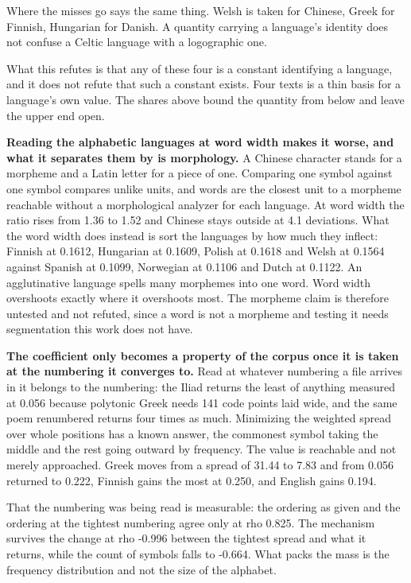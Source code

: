 Where the misses go says the same thing. Welsh is taken for Chinese, Greek for Finnish, Hungarian for Danish. A quantity carrying a language's identity does not confuse a Celtic language with a logographic one.

What this refutes is that any of these four is a constant identifying a language, and it does not refute that such a constant exists. Four texts is a thin basis for a language's own value. The shares above bound the quantity from below and leave the upper end open.

\textbf{Reading the alphabetic languages at word width makes it worse, and what it separates them by is morphology.} A Chinese character stands for a morpheme and a Latin letter for a piece of one. Comparing one symbol against one symbol compares unlike units, and words are the closest unit to a morpheme reachable without a morphological analyzer for each language. At word width the ratio rises from 1.36 to 1.52 and Chinese stays outside at 4.1 deviations. What the word width does instead is sort the languages by how much they inflect: Finnish at 0.1612, Hungarian at 0.1609, Polish at 0.1618 and Welsh at 0.1564 against Spanish at 0.1099, Norwegian at 0.1106 and Dutch at 0.1122. An agglutinative language spells many morphemes into one word. Word width overshoots exactly where it overshoots most. The morpheme claim is therefore untested and not refuted, since a word is not a morpheme and testing it needs segmentation this work does not have.

\textbf{The coefficient only becomes a property of the corpus once it is taken at the numbering it converges to.} Read at whatever numbering a file arrives in it belongs to the numbering: the Iliad returns the least of anything measured at 0.056 because polytonic Greek needs 141 code points laid wide, and the same poem renumbered returns four times as much. Minimizing the weighted spread over whole positions has a known answer, the commonest symbol taking the middle and the rest going outward by frequency. The value is reachable and not merely approached. Greek moves from a spread of 31.44 to 7.83 and from 0.056 returned to 0.222, Finnish gains the most at 0.250, and English gains 0.194.

That the numbering was being read is measurable: the ordering as given and the ordering at the tightest numbering agree only at rho 0.825. The mechanism survives the change at rho -0.996 between the tightest spread and what it returns, while the count of symbols falls to -0.664. What packs the mass is the frequency distribution and not the size of the alphabet.

